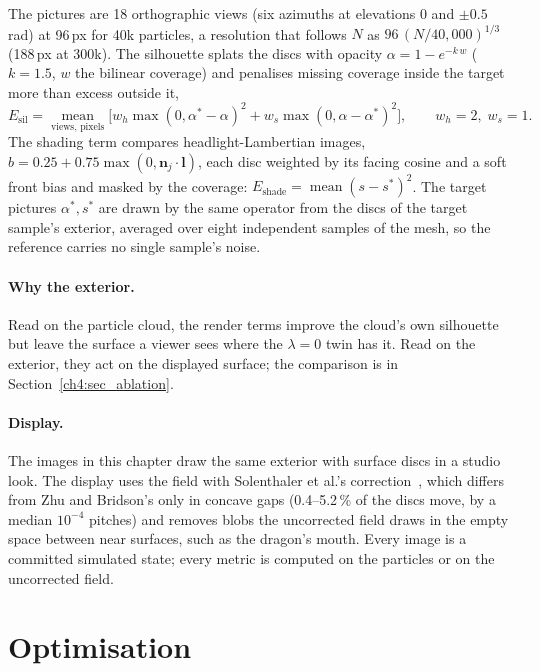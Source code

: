 The pictures are 18 orthographic views (six azimuths at elevations $0$ and $\pm0.5$\,rad) at 96\,px for 40k
particles, a resolution that follows $N$ as $96\,(N/40{,}000)^{1/3}$ (188\,px at 300k). The silhouette splats the discs
with opacity $\alpha=1-e^{-k\,w}$ ($k=1.5$, $w$ the bilinear coverage) and penalises missing coverage inside the
target more than excess outside it,
\begin{equation}
E_{\mathrm{sil}}=\operatorname*{mean}_{\text{views, pixels}}\Big[w_h\max(0,\alpha^\ast-\alpha)^2
 +w_s\max(0,\alpha-\alpha^\ast)^2\Big],\qquad w_h=2,\;w_s=1 .
\end{equation}
The shading term compares headlight-Lambertian images, $b=0.25+0.75\max(0,\mathbf{n}_j\cdot\mathbf{l})$, each disc
weighted by its facing cosine and a soft front bias and masked by the coverage:
$E_{\mathrm{shade}}=\operatorname{mean}(s-s^\ast)^2$. The target pictures $\alpha^\ast,s^\ast$ are drawn by the same
operator from the discs of the target sample's exterior, averaged over eight independent samples of the mesh, so
the reference carries no single sample's noise.

\paragraph{Why the exterior.} Read on the particle cloud, the render terms improve the cloud's own silhouette but
leave the surface a viewer sees where the $\lambda=0$ twin has it. Read on the exterior, they act on the displayed
surface; the comparison is in Section~\ref{ch4:sec_ablation}.

\paragraph{Display.} The images in this chapter draw the same exterior with surface discs in a studio look. The
display uses the field with Solenthaler et al.'s correction~\citep{solenthaler2007unified}, which differs from Zhu
and Bridson's only in concave gaps (0.4--5.2\,\% of the discs move, by a median $10^{-4}$ pitches) and removes blobs the
uncorrected field draws in the empty space between near surfaces, such as the dragon's mouth. Every image is a
committed simulated state; every metric is computed on the particles or on the uncorrected field.

\section{Optimisation}
\label{sec:optimization}

